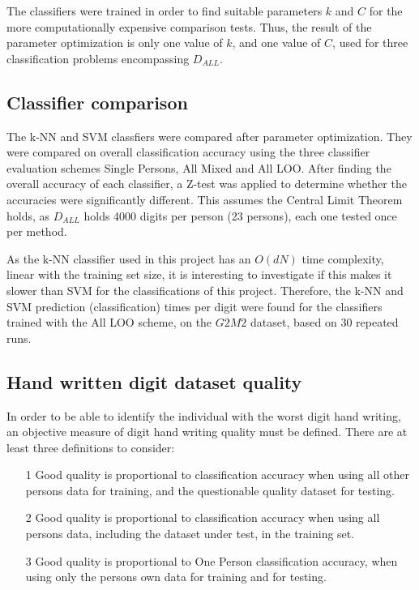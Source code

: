 The classifiers were trained in order to find
suitable parameters \(k\) and \(C\) for the more computationally
expensive comparison tests.
Thus, the result of the parameter optimization is
only one value of \(k\), and one value of \(C\),
used for three classification problems encompassing \(D_{ALL}\).

\subsection{Classifier comparison}
The k-NN and SVM
classfiers were compared
after parameter optimization.
They were compared on overall classification accuracy
using the three classifier evaluation schemes
Single Persons, All Mixed and All LOO.
After finding the overall accuracy of each classifier,
a Z-test was applied to determine whether
the accuracies were significantly different.
This assumes the Central Limit Theorem holds,
as \(D_{ALL}\) holds 4000 digits per person (23 persons),
each one tested once per method.

As the k-NN classifier used in this project
has an \(O\left(d N\right)\) time complexity,
linear with the training set size,
it is interesting to investigate if this makes it slower than SVM
for the classifications of this project.
Therefore, the k-NN and SVM prediction (classification)
times per digit were found for the classifiers
trained with the All LOO scheme, on the \(G2M2\) dataset,
based on 30 repeated runs.

\subsection{Hand written digit dataset quality}
In order to be able to identify the individual with the worst
digit hand writing, an objective measure
of digit hand writing quality must be defined.
There are at least three definitions to consider:
\begin{enumerate}
\item[1] Good quality is proportional to classification accuracy when using all other
persons data for training, and the questionable quality dataset for testing.
\item[2] Good quality is proportional to classification accuracy when using all
persons data, including the dataset under test, in the training set.
\item[3] Good quality is proportional to One Person classification accuracy,
when using only the persons own data for training and for testing.
\end{enumerate}

